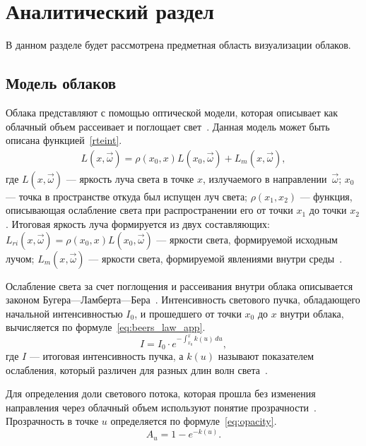 \chapter{Аналитический раздел}

В данном разделе будет рассмотрена предметная область визуализации облаков.

\section{Модель облаков}
\label{math}
Облака представляют с помощью оптической модели, которая описывает как облачный объем рассеивает и поглощает свет~\cite{partmedia, frostbite, hzd, clouds, rtvg}.
Данная модель может быть описана функцией~\eqref{rteint}.
\begin{equation}
	\label{rteint}
	\begin{aligned}
		L(x, \vec{\omega}) = \rho(x_0, x) L(x_0, \vec{\omega}) + L_m(x, \vec{\omega}),
	\end{aligned}
\end{equation}
где $L(x, \vec{\omega})$ --- яркость луча света в точке $x$, излучаемого в направлении~$\vec{\omega}$; $x_0$ --- точка в пространстве откуда был испущен луч света; $\rho(x_1, x_2)$ --- функция, описывающая ослабление света при распространении его от точки $x_1$ до точки $x_2$. Итоговая яркость луча формируется из двух составляющих: $ L_{ri}(x, \vec{\omega}) = \rho(x_0, x) L(x_0, \vec{\omega})$ --- яркости света, формируемой исходным лучом; $ L_m(x, \vec{\omega}) $ --- яркости света, формируемой явлениями внутри среды~\cite{partmedia}.  

Ослабление света за счет поглощения и рассеивания внутри облака описывается законом Бугера---Ламберта---Бера~\mbox{\cite{partmedia, rtvg}}. Интенсивность светового пучка, обладающего начальной интенсивностью $I_0$, и прошедшего от точки $x_0$ до $x$ внутри облака, вычисляется по формуле~\eqref{eq:beers_law_app}.
\begin{equation}
	\label{eq:beers_law_app}
	I = I_0 \cdot e^{-\int_{x_0}^{x} k(u)\,du},
\end{equation}
где $I$ --- итоговая интенсивность пучка, а $k(u)$ называют показателем ослабления, который различен для разных длин волн света~\cite{partmedia, rtvg, hzd, frostbite}.


Для определения доли светового потока, которая прошла без изменения направления через облачный объем используют понятие прозрачности~\mbox{\cite{rtvg, hzd, frostbite}}.
Прозрачность в точке $u$ определяется по формуле~\eqref{eq:opacity}.
\begin{equation}
	\label{eq:opacity}
	A_u = 1 - e^{-k(u)}.
\end{equation}

